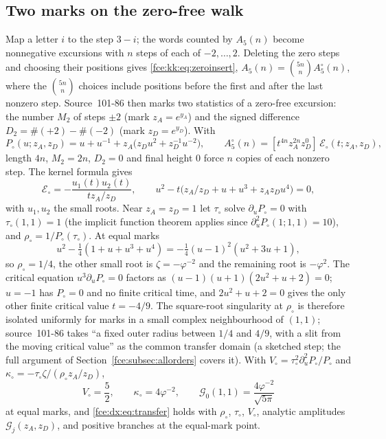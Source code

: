 \documentclass[11pt,a4paper]{article}
\numberwithin{equation}{section}
\theoremstyle{definition}\newtheorem{definition}[theorem]{Definition}
\theoremstyle{remark}\newtheorem{remark}[theorem]{Remark}
\newcommand{\E}{\mathcal E}
\begin{document}
\subsection{Two marks on the zero-free walk}\label{fce:dx:sec:marks}
Map a letter $i$ to the step $3-i$; the words counted by $A_5(n)$ become
nonnegative excursions with $n$ steps of each of $-2,\ldots,2$. Deleting the
zero steps and choosing their positions gives
\eqref{fce:kk:eq:zeroinsert}, $A_5(n)=\binom{5n}nA^\circ_5(n)$, where the
$\binom{5n}n$ choices include positions before the first and after the last
nonzero step. Source~101-86 then marks two statistics of a zero-free
excursion: the number $M_2$ of steps $\pm2$ (mark $z_A=e^{y_A}$) and the
signed difference $D_2=\#(+2)-\#(-2)$ (mark $z_D=e^{y_D}$). With
\begin{equation}\label{fce:dx:eq:Pcirc}
 P_\circ(u;z_A,z_D)=u+u^{-1}+z_A\bigl(z_Du^2+z_D^{-1}u^{-2}\bigr),\qquad
 A^\circ_5(n)=[t^{4n}z_A^{2n}z_D^0]\,\E_\circ(t;z_A,z_D),
\end{equation}
length $4n$, $M_2=2n$, $D_2=0$ and final height $0$ force $n$ copies of each
nonzero step. The kernel formula \cite[Theorem~2 and~(20)]{bf} gives
\begin{equation}\label{fce:dx:eq:kernelcirc}
 \E_\circ=-\frac{u_1(t)u_2(t)}{tz_A/z_D},\qquad
 u^2-t\bigl(z_A/z_D+u+u^3+z_Az_Du^4\bigr)=0,
\end{equation}
with $u_1,u_2$ the small roots. Near $z_A=z_D=1$ let $\tau_\circ$ solve
$\partial_uP_\circ=0$ with $\tau_\circ(1,1)=1$ (the implicit function theorem
applies since $\partial_u^2P_\circ(1;1,1)=10$), and
$\rho_\circ=1/P_\circ(\tau_\circ)$. At equal marks
\[
 u^2-\tfrac14(1+u+u^3+u^4)=-\tfrac14(u-1)^2(u^2+3u+1),
\]
so $\rho_\circ=1/4$, the other small root is $\zeta=-\varphi^{-2}$ and the
remaining root is $-\varphi^2$. The critical equation
$u^3\partial_uP_\circ=0$ factors as $(u-1)(u+1)(2u^2+u+2)=0$; $u=-1$ has
$P_\circ=0$ and no finite critical time, and $2u^2+u+2=0$ gives the only
other finite critical value $t=-4/9$. The square-root singularity at $\rho_\circ$
is therefore isolated uniformly for marks in a small complex neighbourhood
of $(1,1)$; source~101-86 takes ``a fixed outer radius between $1/4$ and
$4/9$, with a slit from the moving critical value'' as the common transfer
domain (a sketched step; the full argument of
Section~\ref{fce:subsec:allorders} covers it). With
$V_\circ=\tau_\circ^2\partial_u^2P_\circ/P_\circ$ and
$\kappa_\circ=-\tau_\circ\zeta/(\rho_\circ z_A/z_D)$,
\begin{equation}\label{fce:dx:eq:A0}
 V_\circ=\frac52,\qquad \kappa_\circ=4\varphi^{-2},\qquad
 \mathcal G_0(1,1)=\frac{4\varphi^{-2}}{\sqrt{5\pi}}
\end{equation}
at equal marks, and \eqref{fce:dx:eq:transfer} holds with $\rho_\circ$,
$\tau_\circ$, $V_\circ$, analytic amplitudes $\mathcal G_j(z_A,z_D)$, and
positive branches at the equal-mark point.
\end{document}
